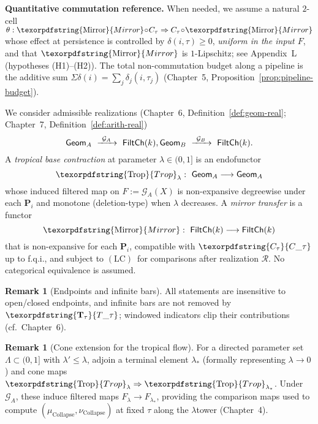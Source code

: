 \documentclass[11pt]{article}
\DeclareRobustCommand{\hyp}{\nobreakdash-}
\newcommand{\Rfun}{\mathcal{R}}
\numberwithin{equation}{section}
\theoremstyle{definition}
\newtheorem{remark}[theorem]{Remark}
\DeclareRobustCommand{\FiltCh}[1]{\mathsf{FiltCh}(#1)}
\DeclareRobustCommand{\Ttau}{\texorpdfstring{\ensuremath{\mathbf{T}_{\tau}}}{T\_\tau}}
\DeclareRobustCommand{\Ctau}{\texorpdfstring{\ensuremath{C_{\tau}}}{C\_\tau}}
\DeclareRobustCommand{\LC}{\texorpdfstring{\ensuremath{\mathrm{(LC)}}}{(LC)}}
\DeclareRobustCommand{\Trop}{\texorpdfstring{\ensuremath{\operatorname{Trop}}}{Trop}}
\DeclareRobustCommand{\Mirror}{\texorpdfstring{\ensuremath{\operatorname{Mirror}}}{Mirror}}
\providecommand{\n}{\unskip\space}
\begin{document}
\noindent\textbf{Quantitative commutation reference.}
When needed, we assume a natural \(2\)\hyp cell \(\theta:\Mirror\!\circ\! C_\tau\Rightarrow C_\tau\!\circ\!\Mirror\) whose effect at persistence is controlled by \(\delta(i,\tau)\ge 0\), \emph{uniform in the input \(F\)}, and that \(\Mirror\) is \(1\)\hyp Lipschitz; see Appendix~L (hypotheses \textup{(H1)}–\textup{(H2)}). The total non\hyp commutation budget along a pipeline is the additive sum \(\Sigma\delta(i)=\sum_j \delta_j(i,\tau_j)\) (Chapter~5, Proposition~\ref{prop:pipeline-budget}).

\medskip
We consider admissible realizations (Chapter~6, Definition~\ref{def:geom-real}; Chapter~7, Definition~\ref{def:arith-real})
\[
  \mathsf{Geom}_A\ \xrightarrow{\ \mathcal{G}_A\ }\ \FiltCh{k},\qquad\n  \mathsf{Geom}_B\ \xrightarrow{\ \mathcal{G}_B\ }\ \FiltCh{k}.
\]
A \emph{tropical base contraction} at parameter \(\lambda\in(0,1]\) is an endofunctor
\[
  \Trop_\lambda:\ \mathsf{Geom}_A\longrightarrow \mathsf{Geom}_A
\]
whose induced filtered map on \(F:=\mathcal{G}_A(X)\) is non\hyp expansive degreewise under each \(\mathbf{P}_i\) and monotone (deletion\hyp type) when \(\lambda\) decreases. A \emph{mirror transfer} is a functor
\[
  \Mirror:\ \FiltCh{k}\longrightarrow \FiltCh{k}
\]
that is non\hyp expansive for each \(\mathbf{P}_i\), compatible with \(\Ctau\) up to f.q.i., and subject to \LC\ for comparisons after realization \(\Rfun\). No categorical equivalence is assumed.

\begin{remark}[Endpoints and infinite bars]\label{rk:8-endpoints}
All statements are insensitive to open/closed endpoints, and infinite bars are not removed by \(\Ttau\);
windowed indicators clip their contributions (cf.\ Chapter~6).
\end{remark}

\begin{remark}[Cone extension for the tropical flow]\label{rk:8-cone}
For a directed parameter set \(\Lambda\subset(0,1]\) with \(\lambda'\le \lambda\), adjoin a terminal element \(\lambda_\ast\) (formally representing \(\lambda\to 0\)) and cone maps \(\Trop_{\lambda}\Rightarrow \Trop_{\lambda_\ast}\).
Under \(\mathcal{G}_A\), these induce filtered maps \(F_\lambda\to F_{\lambda_\ast}\), providing the comparison maps used to compute \((\mu_{\mathrm{Collapse}},\nu_{\mathrm{Collapse}})\) at fixed \(\tau\) along the \(\lambda\)\nobreakdash tower (Chapter~4).
\end{remark}
\end{document}
